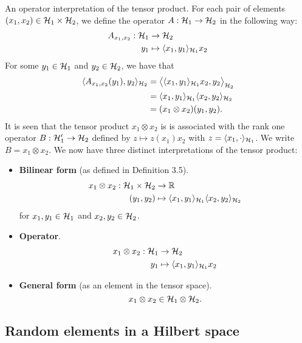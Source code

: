 An operator interpretation of the tensor product.
For each pair of elements $(x_1,x_2) \in {\mathcal H}_1\times{\mathcal H}_2$, we define the operator $A:{\mathcal H}_1\to{\mathcal H}_2$ in the following way:
\begin{align*}
  A_{x_1,x_2}:{\mathcal H}_1&\to{\mathcal H}_2 \\
  y_1&\mapsto \langle x_1,y_1\rangle_{{\mathcal H}_1}x_2
\end{align*}
For some $y_1\in{\mathcal H}_1$ and $y_2\in{\mathcal H}_2$, we have that
\begin{align*}
  \langle A_{x_1,x_2}(y_1),y_2\rangle_{{\mathcal H}_2} 
  &= \big\langle \langle x_1,y_1\rangle_{{\mathcal H}_1}x_2 , y_2 \big\rangle_{{\mathcal H}_2} \\
  &= \langle x_1,y_1\rangle_{{\mathcal H}_1}\langle x_2,y_2\rangle_{{\mathcal H}_2} \\
  &= (x_1\otimes x_2)(y_1,y_2).
\end{align*}
It is seen that the tensor product $x_1\otimes x_2$ is is associated with the rank one operator $B:{\mathcal H}_1'\to{\mathcal H}_2$ defined by $z \mapsto z(x_1)x_2$ with $z = \langle x_1,\cdot\rangle_{{\mathcal H}_1}$.
We write $B = x_1 \otimes x_2$.
We now have three distinct interpretations of the tensor product:
\begin{itemize}
  \item \textbf{Bilinear form} (as defined in Definition 3.5). 
  \begin{align*}
    x_1 \otimes x_2:{\mathcal H}_1 \times {\mathcal H}_2 &\to \mathbb{R} \\
    (y_1,y_2) &\mapsto \langle x_1,y_1\rangle_{{\mathcal H}_1}\langle x_2,y_2\rangle_{{\mathcal H}_2}
  \end{align*}
  for $x_1,y_1\in{\mathcal H}_1$ and $x_2,y_2\in{\mathcal H}_2$.
  \item \textbf{Operator}.
  \begin{align*}
    x_1 \otimes x_2:{\mathcal H}_1 &\to {\mathcal H}_2 \\
    y_1 &\mapsto \langle x_1,y_1\rangle_{{\mathcal H}_1}x_2
  \end{align*}  
  \item \textbf{General form} (as an element in the tensor space).
  \[
    x_1 \otimes x_2 \in {\mathcal H}_1 \otimes {\mathcal H}_2.
  \]
\end{itemize}

\subsection{Random elements in a Hilbert space}


